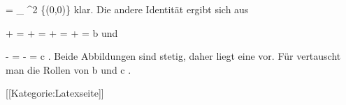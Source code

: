 \mavergleichskettedisp
{\vergleichskette
{ \varphi \circ \psi
}
{ =} {
_{ \R^2 \setminus \{(0,0)\}  }
}
{ } {
}
{ } {
}
{ } {
}
}
{}{}{}
klar. Die andere Identität ergibt sich aus

\mavergleichskettealign
{\vergleichskettealign
{ {  } + 
}
{ =} { {  } + {  }  
}
{ =} { {  } + {  }  
}
{ =} { {  } + {  }
}
{ =} {b
}
}
{}
{}{}
und

\mavergleichskettedisp
{\vergleichskette
{ {  } - 
}
{ =} { {  } - {  }
}
{ =} { c
}
{ } {}
{ } {}
}
{}{}{.}
Beide Abbildungen sind stetig, daher liegt eine
vor.
Für
 vertauscht man die Rollen von
\mathkor {} {b} {und} {c} {.}

 [[Kategorie:Latexseite]]
